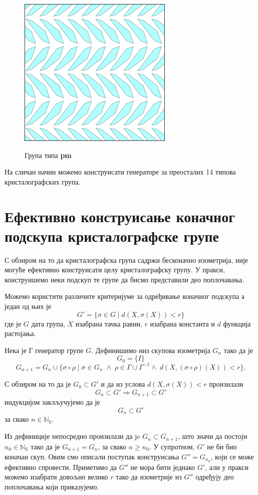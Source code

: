 \documentclass[12pt]{report}
\begin{document}
\begin{figure}[H]
\centering
    \includegraphics[width=.3\textwidth]{plavo_p3.png}
    \label{fig:plavopm}
    \caption{Група типа \textbf{pm}}
  \end{figure}



На сличан начин можемо конструисати генераторе за преосталих 14 типова кристалографских група.

\section{Ефективно конструисање коначног подскупа кристалографске групе}

С обзиром на то да кристалографска група садржи бесконачно изометрија, није могуће ефективно конструисати целу кристалографску групу. У пракси, конструишемо неки подскуп те групе да  бисмо представили део поплочавања.

Можемо користити различите критеријуме за одређивање коначног подскупа а један од њих је $$G' = \{\sigma \in G \;|\; d(X,\sigma(X)) < r\} $$ где је $G$ дата група, $X$ изабрана тачка равни, $r$ изабрана константа и $d$ функција растојања.

Нека је Г генератор групе $G$. Дефинишимо низ скупова изометрија $G_n$ тако да је $$G_0 = \{I\}$$
$$G_{n+1} = G_n \cup \{\sigma \circ \rho \;|\; \sigma \in G_n\; \wedge \; \rho \in \Gamma \cup \Gamma^{-1} \wedge \; d(X,(\sigma \circ \rho)(X)) < r \}. $$

С обзиром на то да је $G_0 \subset G'$ и да из услова $d(X,\sigma(X)) < r$ произилази 
$$G_n \subset G' \Rightarrow G_{n+1} \subset G'$$ индукцијом заклључујемо да је $$G_n \subset G'$$ за свако $n \in \mathbb{N_0}.$

Из дефиниције непосредно произилази да je $G_n \subset G_{n+1}$, што значи да постоји \\ $n_0\in \mathbb{N_0}$ тако да је $G_{n+1} = G_n$, за свако $n\geq n_0$. У супротном, $G'$ не би био коначан скуп. Овим смо описали поступак конструисања $G''= G_{n_0}$, који се може ефективно спровести. Приметимо да $G''$ не мора бити једнако $G'$, али у пракси можемо изабрати довољно велико $r$ тако да  изометрије из $G''$ одређују део поплочавања који приказујемо. 
\end{document}

